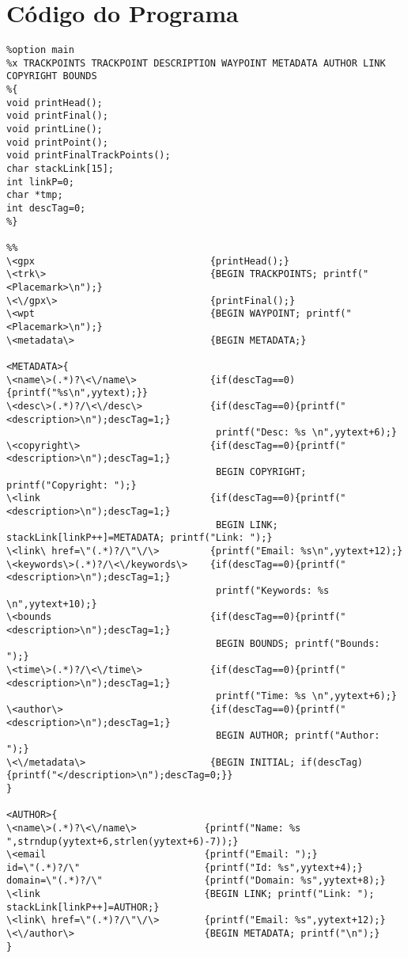 \documentclass{llncs}
\begin{document}
\appendix
\section{Código do Programa}

\small
\begin{changemargin}{-4cm}{0cm}
\begin{verbatim}
%option main
%x TRACKPOINTS TRACKPOINT DESCRIPTION WAYPOINT METADATA AUTHOR LINK COPYRIGHT BOUNDS
%{
void printHead();
void printFinal();
void printLine();
void printPoint();
void printFinalTrackPoints();
char stackLink[15];
int linkP=0;
char *tmp;
int descTag=0;
%}

%%
\<gpx                               {printHead();}
\<trk\>                             {BEGIN TRACKPOINTS; printf("<Placemark>\n");}
\<\/gpx\>                           {printFinal();}
\<wpt                               {BEGIN WAYPOINT; printf("<Placemark>\n");}
\<metadata\>                        {BEGIN METADATA;}

<METADATA>{
\<name\>(.*)?\<\/name\>             {if(descTag==0){printf("%s\n",yytext);}}
\<desc\>(.*)?/\<\/desc\>            {if(descTag==0){printf("<description>\n");descTag=1;}
                                     printf("Desc: %s \n",yytext+6);}
\<copyright\>                       {if(descTag==0){printf("<description>\n");descTag=1;} 
                                     BEGIN COPYRIGHT; printf("Copyright: ");}
\<link                              {if(descTag==0){printf("<description>\n");descTag=1;} 
                                     BEGIN LINK; stackLink[linkP++]=METADATA; printf("Link: ");}
\<link\ href=\"(.*)?/\"\/\>         {printf("Email: %s\n",yytext+12);}
\<keywords\>(.*)?/\<\/keywords\>    {if(descTag==0){printf("<description>\n");descTag=1;} 
                                     printf("Keywords: %s \n",yytext+10);}
\<bounds                            {if(descTag==0){printf("<description>\n");descTag=1;} 
                                     BEGIN BOUNDS; printf("Bounds: ");}
\<time\>(.*)?/\<\/time\>            {if(descTag==0){printf("<description>\n");descTag=1;} 
                                     printf("Time: %s \n",yytext+6);}
\<author\>                          {if(descTag==0){printf("<description>\n");descTag=1;} 
                                     BEGIN AUTHOR; printf("Author: ");}
\<\/metadata\>                      {BEGIN INITIAL; if(descTag){printf("</description>\n");descTag=0;}}
}

<AUTHOR>{
\<name\>(.*)?\<\/name\>            {printf("Name: %s ",strndup(yytext+6,strlen(yytext+6)-7));}
\<email                            {printf("Email: ");}
id=\"(.*)?/\"                      {printf("Id: %s",yytext+4);}
domain=\"(.*)?/\"                  {printf("Domain: %s",yytext+8);}
\<link                             {BEGIN LINK; printf("Link: "); stackLink[linkP++]=AUTHOR;}
\<link\ href=\"(.*)?/\"\/\>        {printf("Email: %s",yytext+12);}
\<\/author\>                       {BEGIN METADATA; printf("\n");}
}


\end{verbatim}
\end{changemargin}
\end{document}
